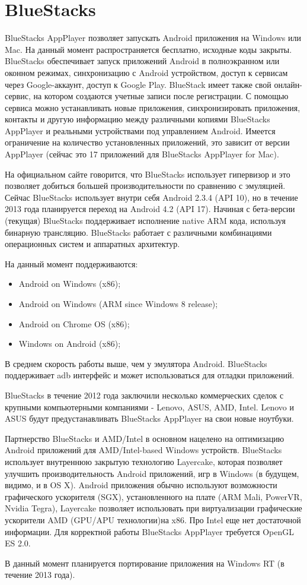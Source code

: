 \section{BlueStacks}
BlueStacks AppPlayer позволяет запускать Android приложения на Windows или Mac. На данный момент распространяется бесплатно, исходные коды закрыты. BlueStacks обеспечивает запуск приложений Android в полноэкранном или оконном режимах, синхронизацию с Android устройством, доступ к сервисам через Google-аккаунт, доступ к Google Play. BlueStack имеет также свой онлайн-сервис, на котором создаются учетные записи после регистрации. С помощью сервиса можно устанавливать новые приложения, синхронизировать приложения, контакты и другую информацию между различными копиями BlueStacks AppPlayer и реальными устройствами под управлением Android. Имеется ограничение на количество установленных приложений, это зависит от версии AppPlayer (сейчас это 17 приложений для BlueStacks AppPlayer for Mac).

На официальном сайте говорится, что BlueStacks использует гипервизор и это позволяет добиться большей производительности по сравнению с эмуляцией. Сейчас BlueStacks использует внутри себя Android 2.3.4 (API 10), но в течение 2013 года планируется переход на Android 4.2 (API 17). Начиная с бета-версии (текущая) BlueStacks поддерживает исполнение native ARM кода, используя бинарную трансляцию. BlueStacks работает с различными комбинациями операционных систем и аппаратных архитектур.

На данный момент поддерживаются:
\begin{itemize}
    \item Android on Windows (x86);
    \item Android on Windows (ARM since Windows 8 release);
    \item Android on Chrome OS (x86);
    \item Windows on Android (x86);
\end{itemize}

В среднем скорость работы выше, чем у эмулятора Android. BlueStacks поддерживает adb интерфейс и может использоваться для отладки приложений.

BlueStacks в течение 2012 года заключили несколько коммерческих сделок с крупными компьютерными компаниями - Lenovo, ASUS, AMD, Intel. Lenovo и ASUS будут предустанавливать BlueStacks AppPlayer на свои новые ноутбуки.

Партнерство BlueStacks и AMD/Intel в основном нацелено на оптимизацию Android приложений для AMD/Intel-based Windows устройств. BlueStacks использует внутреннюю закрытую технологию Layercake, которая позволяет улучшить производительность Android приложений, игр в Windows (в будущем, видимо, и в OS X). Android приложения обычно используют возможности графического ускорителя (SGX), установленного на плате (ARM Mali, PowerVR, Nvidia Tegra), Layercake позволяет использовать при виртуализации графические ускорители AMD (GPU/APU технологии)на x86. Про Intel еще нет достаточной информации. Для корректной работы BlueStacks AppPlayer требуется OpenGL ES 2.0.

В данный момент планируется портирование приложения на Windows RT (в течение 2013 года).




